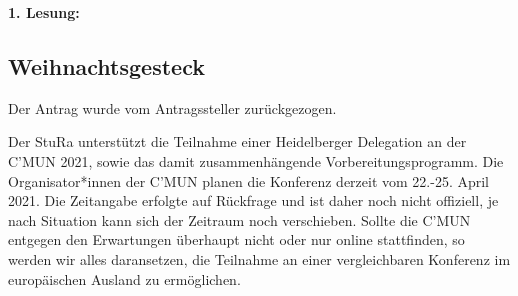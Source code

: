 {
    \textbf{1. Lesung:}
    \ul{
        \ul{}
    }
}
\subsection{Weihnachtsgesteck}
Der Antrag wurde vom Antragssteller zurückgezogen.

{
    Der StuRa unterstützt die Teilnahme einer Heidelberger Delegation an der C’MUN 2021, sowie das damit zusammenhängende Vorbereitungsprogramm. Die Organisator*innen der C’MUN planen die Konferenz derzeit vom 22.-25. April 2021. Die Zeitangabe erfolgte auf Rückfrage und ist daher noch nicht offiziell, je nach Situation kann sich der Zeitraum noch verschieben. Sollte die C’MUN entgegen den Erwartungen überhaupt nicht oder nur online stattfinden, so werden wir alles daransetzen, die Teilnahme an einer vergleichbaren Konferenz im europäischen Ausland zu ermöglichen.

}
